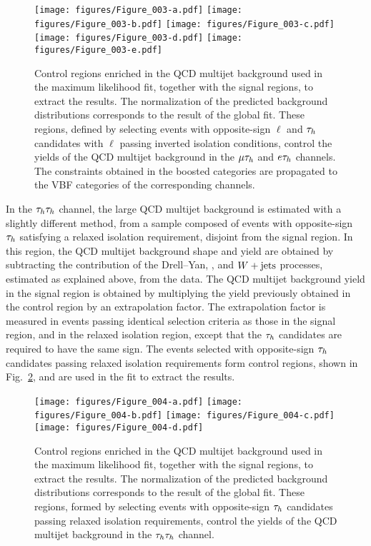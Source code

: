 \begin{figure*}[!htbp]
\centering
     \texttt{[image: figures/Figure\_003-a.pdf]}
     \texttt{[image: figures/Figure\_003-b.pdf]}
     \texttt{[image: figures/Figure\_003-c.pdf]}
     \texttt{[image: figures/Figure\_003-d.pdf]}
     \texttt{[image: figures/Figure\_003-e.pdf]}
     \caption{Control regions enriched in the QCD multijet background used in the maximum likelihood fit, together with the signal regions, to extract the results. The normalization of the predicted background distributions corresponds to the result of the global fit. These regions, defined by selecting events with opposite-sign $\ell$ and $\tau_{h}$ candidates with $\ell$ passing inverted isolation conditions,  control the
yields of the QCD multijet background in the $\mu\tau_{h}$ and $e\tau_{h}$ channels.  The constraints obtained in the boosted categories are propagated to the VBF categories of the corresponding channels.}
     \label{fig:CR3}
\end{figure*}

In the $\tau_{h}\tau_{h}$ channel, the large QCD multijet background is estimated with a slightly different method, from
a sample composed of events with opposite-sign $\tau_{h}$ satisfying a relaxed isolation requirement, disjoint from the signal region.
In this region, the QCD multijet background shape and yield are obtained
by subtracting the contribution of the
Drell--Yan, \ttbar, and $W+\text{jets}$ processes, estimated as explained above, from the data.
The QCD multijet background yield in the signal region is obtained by multiplying
the yield previously obtained in the control region by an extrapolation factor.
The extrapolation factor is measured in events passing identical selection criteria as those in the signal region, and in the relaxed
isolation region, except that the $\tau_{h}$ candidates are required to have the same sign.
The events selected with opposite-sign $\tau_{h}$ candidates passing relaxed isolation requirements form control regions, shown in Fig.~\ref{fig:CR4}, and are used in the fit to extract the results.

\begin{figure*}[!htbp]
\centering
     \texttt{[image: figures/Figure\_004-a.pdf]}
     \texttt{[image: figures/Figure\_004-b.pdf]}
     \texttt{[image: figures/Figure\_004-c.pdf]}
     \texttt{[image: figures/Figure\_004-d.pdf]}
     \caption{Control regions enriched in the QCD multijet background used in the maximum likelihood fit, together with the signal regions, to extract the results. The normalization of the predicted background distributions corresponds to the result of the global fit. These regions, formed by selecting events with opposite-sign $\tau_{h}$ candidates passing relaxed isolation requirements, control the yields of the QCD multijet background in the $\tau_{h}\tau_{h}$ channel.}
     \label{fig:CR4}
\end{figure*}

